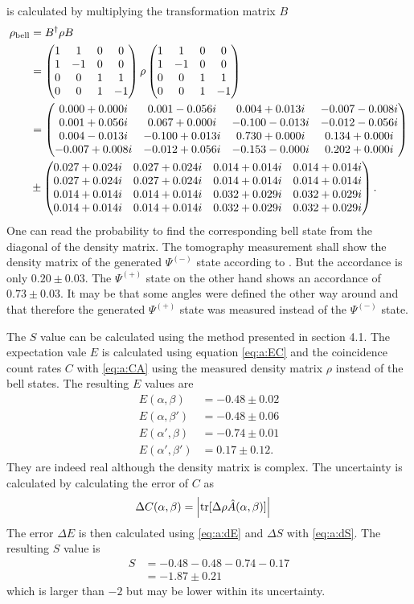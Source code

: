 is calculated by multiplying the transformation matrix $B$
\begin{align}
\rho_\text{bell}
    &=B^\dagger \rho B
    \label{eq:a:rho_bell}\\
    &=\begin{pmatrix}
    1&1&0&0\\
    1&-1&0&0\\
    0&0&1&1\\
    0&0&1&-1\\
    \end{pmatrix}
    \rho
    \begin{pmatrix}
    1&1&0&0\\
    1&-1&0&0\\
    0&0&1&1\\
    0&0&1&-1\\
    \end{pmatrix}
    \nonumber\\
    &=\begin{pmatrix} 0.000+0.000i &0.001-0.056i &0.004+0.013i &-0.007-0.008i\\ 0.001+0.056i &0.067+0.000i &-0.100-0.013i &-0.012-0.056i\\ 0.004-0.013i &-0.100+0.013i &0.730+0.000i &0.134+0.000i\\ -0.007+0.008i &-0.012+0.056i &-0.153-0.000i &0.202+0.000i \end{pmatrix}
    \nonumber\\
    &\pm \begin{pmatrix} 0.027+0.024i &0.027+0.024i &0.014+0.014i &0.014+0.014i\\ 0.027+0.024i &0.027+0.024i &0.014+0.014i &0.014+0.014i\\ 0.014+0.014i &0.014+0.014i &0.032+0.029i &0.032+0.029i\\ 0.014+0.014i &0.014+0.014i &0.032+0.029i &0.032+0.029i \end{pmatrix} .
    \nonumber
\end{align}
One can read the probability to find the corresponding bell state from the diagonal of the density matrix.
The tomography measurement shall show the density matrix of the generated $\Psi^{(-)}$ state according to \cite{barz}.
But the accordance is only $0.20\pm 0.03$.
The $\Psi^{(+)}$ state on the other hand shows an accordance of $0.73\pm0.03$.
It may be that some angles were defined the other way around and that therefore the generated $\Psi^{(+)}$ state was measured instead of the $\Psi^{(-)}$ state.

The $S$ value can be calculated using the method presented in section 4.1.
The expectation vale $E$ is calculated using equation \eqref{eq:a:EC} and the coincidence count rates $C$ with \eqref{eq:a:CA} using the measured density matrix $\rho$ instead of the bell states.
The resulting $E$ values are
\begin{align*}
    E(\alpha,\beta)&=-0.48\pm 0.02\\
    E(\alpha,\beta')&=-0.48\pm 0.06\\
    E(\alpha',\beta)&=-0.74\pm 0.01\\
    E(\alpha',\beta')&=0.17\pm 0.12.
\end{align*}
They are indeed real although the density matrix is complex.
The uncertainty is calculated by calculating the error of $C$ as
\begin{align}
\Delta C(\alpha,\beta)
    &=\abs{\trace[\Delta\rho \hat A(\alpha,\beta)]}\label{eq:a:dCdrho}
\end{align}
The error $\Delta E$ is then calculated using \eqref{eq:a:dE} and $\Delta S$ with \eqref{eq:a:dS}.
The resulting $S$ value is
\begin{align*}
S
    &=-0.48-0.48-0.74-0.17\\
    &=-1.87\pm 0.21
\end{align*}
which is larger than $-2$ but may be lower within its uncertainty.

